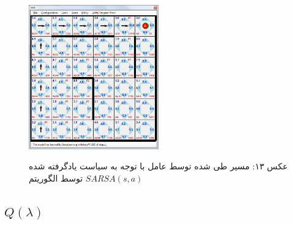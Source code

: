 \documentclass[10pt,a4paper]{article}
\begin{document}
\begin{figure}[H]
    \centering
    \includegraphics[width=0.5\textwidth]{r-exec}
    \begin{center}
    \textarabic{عکس ۱۳: مسیر طی شده توسط عامل با توجه به سیاست یادگرفته شده توسط الگوریتم $SARSA(s, a)$ }
    \end{center}
\end{figure}


\subsection{$Q(\lambda)$}
\end{document}
